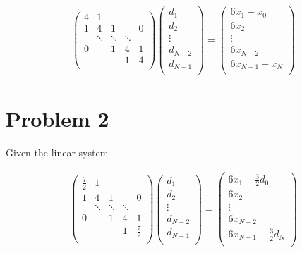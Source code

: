 \documentclass[paper=a4, fontsize=11pt]{scrartcl} %
\begin{document}
\begin{align*}
    \begin{pmatrix}
        4 & 1 \\
        1 & 4 & 1 & & 0\\
          & \ddots & \ddots & \ddots \\
        0 & & 1 & 4 & 1\\
          & &   & 1 & 4\\
    \end{pmatrix} \begin{pmatrix}
        d_{1}\\
        d_{2}\\
        \vdots\\
        d_{N-2}\\
        d_{N-1}\\
    \end{pmatrix} = \begin{pmatrix}
        6x_{1} - x_{0}\\
        6x_{2}\\
        \vdots\\
        6x_{N-2}\\
        6x_{N-1} - x_{N}\\
    \end{pmatrix}
\end{align*}

\section*{Problem 2}
\setcounter{section}{2}
\setcounter{subsection}{1}

Given the linear system

\begin{align*}
    \begin{pmatrix}
        \frac{7}{2} & 1 \\
        1 & 4 & 1 & & 0\\
          & \ddots & \ddots & \ddots \\
        0 & & 1 & 4 & 1\\
          & &   & 1 & \frac{7}{2}\\
    \end{pmatrix} \begin{pmatrix}
        d_{1}\\
        d_{2}\\
        \vdots\\
        d_{N-2}\\
        d_{N-1}\\
    \end{pmatrix} = \begin{pmatrix}
        6x_{1} - \frac{3}{2}d_{0}\\
        6x_{2}\\
        \vdots\\
        6x_{N-2}\\
        6x_{N-1} - \frac{3}{2}d_{N}\\
    \end{pmatrix}
\end{align*}
\end{document}
